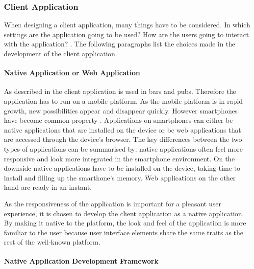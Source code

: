 \subsubsection{Client Application}
\label{ssub:client_application}

When designing a client application, many things have to be considered.  In which settings are the application going to be used? How are the users going to interact with the application? . The following paragraphs list the choices made in the development of the client application.

\paragraph{Native Application or Web Application}
\label{par:native_application_or_web_application}

As described in  the client application is used in bars and pubs. Therefore the application has to run on a mobile platform. As the mobile platform is in rapid growth, new possibilities appear and disappear quickly. However smartphones have become common property . Applications on smartphones can either be native applications that are installed on the device or be web applications that are accessed through the device's browser. The key differences between the two types of applications can be summarised by; native applications often feel more responsive and look more integrated in the smartphone environment. On the downside native applications have to be installed on the device, taking time to install and filling up the smarthone's memory. Web applications on the other hand are ready in an instant.

As the responsiveness of the application is important for a pleasant user experience, it is chosen to develop the client application as a native application. By making it native to the platform, the look and feel of the application is more familiar to the user because user interface elements share the same traits as the rest of the well-known platform.

\paragraph{Native Application Development Framework}
\label{par:native_application_development_framework}


